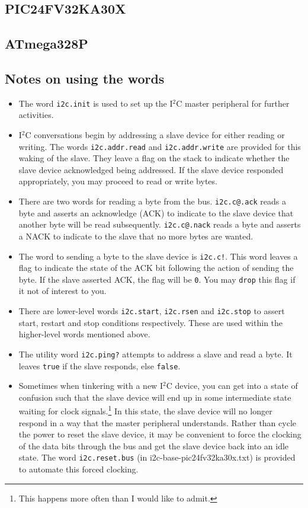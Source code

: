 \documentclass[12pt,a4paper]{article}
\newcommand{\code}[2]{
 \hrulefill
 \scriptsize
 
 \hrulefill
 \vspace{2em}
 \normalsize
}
\begin{document}
\subsection{PIC24FV32KA30X}
\code{}{../pic24/i2c-base-pic24fv32ka30x.txt}

\subsection{ATmega328P}
\code{}{../avr8-2016/i2c-base-avr.txt}

\subsection{Notes on using the words}
\begin{itemize}
  \item The word \verb!i2c.init! is used to set up the I$^2$C master peripheral for further activities.
  \item I$^2$C conversations begin by addressing a slave device for either reading or writing.
    The words \verb!i2c.addr.read! and \verb!i2c.addr.write! are provided for this waking of the slave.
    They leave a flag on the stack to indicate whether the slave device acknowledged being addressed.
    If the slave device responded appropriately, you may proceed to read or write bytes.
  \item There are two words for reading a byte from the bus.  
    \verb!i2c.c@.ack! reads a byte and asserts an acknowledge (ACK) to indicate to the slave device that
    another byte will be read subsequently.
    \verb!i2c.c@.nack! reads a byte and asserts a NACK to indicate to the slave that no more bytes are wanted.
  \item The word to sending a byte to the slave device is \verb?i2c.c!?.
    This word leaves a flag to indicate the state of the ACK bit following the action of sending the byte.
    If the slave asserted ACK, the flag will be \verb!0!.
    You may \verb!drop! this flag if it not of interest to you.
  \item There are lower-level words \verb!i2c.start!, \verb!i2c.rsen! and \verb!i2c.stop! to assert
    start, restart and stop conditions respectively.
    These are used within the higher-level words mentioned above.
  \item The utility word \verb!i2c.ping?! attempts to address a slave and read a byte.
    It leaves \verb!true! if the slave responds, else \verb!false!.
  \item Sometimes when tinkering with a new I$^2$C device,
    you can get into a state of confusion such that the slave device will end up in some intermediate state
    waiting for clock signals.\footnote{This happens more often than I would like to admit.}
    In this state, the slave device will no longer respond in a way that the master peripheral understands.
    Rather than cycle the power to reset the slave device, it may be convenient to force the clocking
    of the data bits through the bus and get the slave device back into an idle state.
    The word \verb!i2c.reset.bus! (in i2c-base-pic24fv32ka30x.txt) is provided to automate this
    forced clocking.
\end{itemize}
\end{document}
